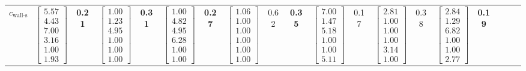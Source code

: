 \documentclass[journal]{IEEEtran}
\begin{document}
\begin{table}[tbh]
\begin{tabular}{l | cc cc cc cc c | cc cc cc cc c}
        $c_{\text{wall-s}}$
        & \multicolumn{1}{c}{$\begin{bmatrix} 5.57\\4.43\\7.00\\3.16\\1.00\\1.93 \end{bmatrix}$} & \textbf{0.21}
        & \multicolumn{1}{c}{$\begin{bmatrix} 1.00\\1.23\\4.95\\1.00\\1.00\\1.00 \end{bmatrix}$} & \textbf{0.31}
        & \multicolumn{1}{c}{$\begin{bmatrix} 1.00\\4.82\\4.95\\6.28\\1.00\\1.00 \end{bmatrix}$} & \textbf{0.27}
        & \multicolumn{1}{c}{$\begin{bmatrix} 1.06\\1.00\\1.00\\1.00\\1.00\\1.00 \end{bmatrix}$} & 0.62 & \textbf{0.35}
        & \multicolumn{1}{c}{$\begin{bmatrix} 7.00\\1.47\\5.18\\1.00\\1.00\\5.11 \end{bmatrix}$} & 0.17
        & \multicolumn{1}{c}{$\begin{bmatrix} 2.81\\1.00\\1.00\\1.00\\3.14\\1.00 \end{bmatrix}$} & 0.38
        & \multicolumn{1}{c}{$\begin{bmatrix} 2.84\\1.29\\6.82\\1.00\\1.00\\2.77 \end{bmatrix}$} & \textbf{0.19}

\end{tabular}
\end{table}
\end{document}
